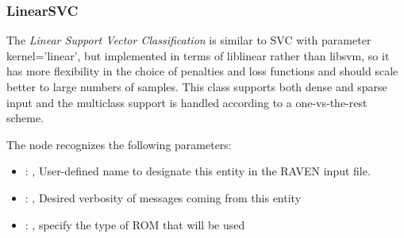 \subsubsection{LinearSVC}
  The  \textit{Linear Support Vector Classification} is
  similar to SVC with parameter kernel=’linear’, but implemented in terms of liblinear rather than
  libsvm,                             so it has more flexibility in the choice of penalties and loss
  functions and should scale better to large numbers of samples.                             This
  class supports both dense and sparse input and the multiclass support is handled according to a
  one-vs-the-rest scheme.                             

  The  node recognizes the following parameters:
    \begin{itemize}
      \item {}: , 
        User-defined name to designate this entity in the RAVEN input file.
      \item {}: , 
        Desired verbosity of messages coming from this entity
      \item {}: , 
        specify the type of ROM that will be used
  \end{itemize}

